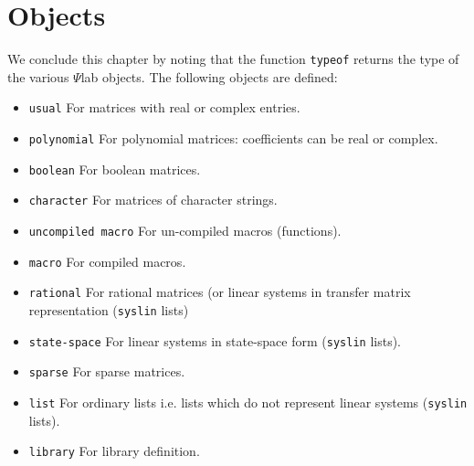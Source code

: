 \section{Objects}
We conclude this chapter by noting that the function {\tt typeof}
returns the type of the various $\Psi$lab objects. The following objects
are defined:
\begin{itemize}
\item{\tt usual} For matrices with real or complex entries.
\item{\tt polynomial} For polynomial matrices: coefficients can be 
real or complex.
\item{\tt boolean} For boolean matrices.
\item{\tt character} For matrices of character strings.
\item{\tt uncompiled macro} For un-compiled macros (functions).
\item{\tt macro} For compiled macros.
\item{\tt rational} For rational matrices (or linear systems in
transfer matrix representation ({\tt syslin} lists)
\item{\tt state-space} For linear systems in state-space 
form ({\tt syslin} lists).
\item{\tt sparse} For sparse matrices.
\item{\tt list} For ordinary lists i.e. lists which do not represent
linear systems ({\tt syslin} lists).
\item{\tt library} For library definition.
\end{itemize}
